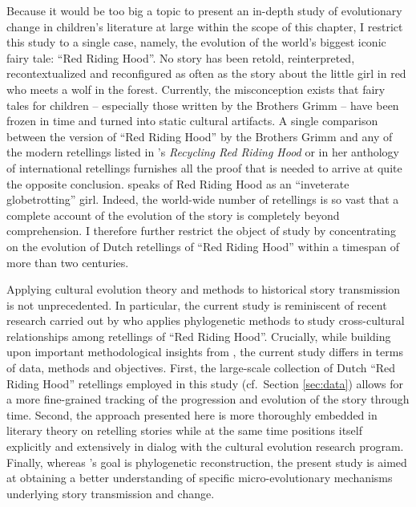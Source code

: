 Because it would be too big a topic to present an in-depth study of evolutionary change in children's literature at large within the scope of this chapter, I restrict this study to a single case, namely, the evolution of the world's biggest iconic fairy tale: ``Red Riding Hood''. No story has been retold, reinterpreted, recontextualized and reconfigured as often as the story about the little girl in red who meets a wolf in the forest\autocite{zipes:1993,beckett:2002,beckett:2008}. Currently, the misconception exists that fairy tales for children -- especially those written by the Brothers Grimm -- have been frozen in time and turned into static cultural artifacts. A single comparison between the version of ``Red Riding Hood'' by the Brothers Grimm and any of the modern retellings listed in \citeauthor{beckett:2002}'s \emph{Recycling Red Riding Hood} or in her anthology of international retellings furnishes all the proof that is needed to arrive at quite the opposite conclusion\autocite{beckett:2002,beckett:2014}. \citeauthor{beckett:2014} speaks of Red Riding Hood as an ``inveterate globetrotting'' girl\autocite{beckett:2014}. Indeed, the world-wide number of retellings is so vast that a complete account of the evolution of the story is completely beyond comprehension. I therefore further restrict the object of study by concentrating on the evolution of Dutch retellings of ``Red Riding Hood'' within a timespan of more than two centuries.

Applying cultural evolution theory and methods to historical story transmission is not unprecedented. In particular, the current study is reminiscent of recent research carried out by \citeauthor{tehrani:2013} who applies phylogenetic methods to study cross-cultural relationships among retellings of ``Red Riding Hood''.\autocite{tehrani:2013} Crucially, while building upon important methodological insights from \citeauthor{tehrani:2013}, the current study differs in terms of data, methods and objectives. First, the large-scale collection of Dutch ``Red Riding Hood'' retellings employed in this study (cf.\ Section \ref{sec:data}) allows for a more fine-grained tracking of the progression and evolution of the story through time. Second, the approach presented here is more thoroughly embedded in literary theory on retelling stories\autocite[e.g.][]{stephens_mccallum,zipes:1993,beckett:2002,sanders:2006,hutcheon:2013} while at the same time positions itself explicitly and extensively in dialog with the cultural evolution research program\autocite{sforzafeldman:1981,boyd_richerson:1985,mesoudi:2011}. Finally, whereas \citeauthor{tehrani:2013}'s goal is phylogenetic reconstruction, the present study is aimed at obtaining a better understanding of specific micro-evolutionary mechanisms underlying story transmission and change.

